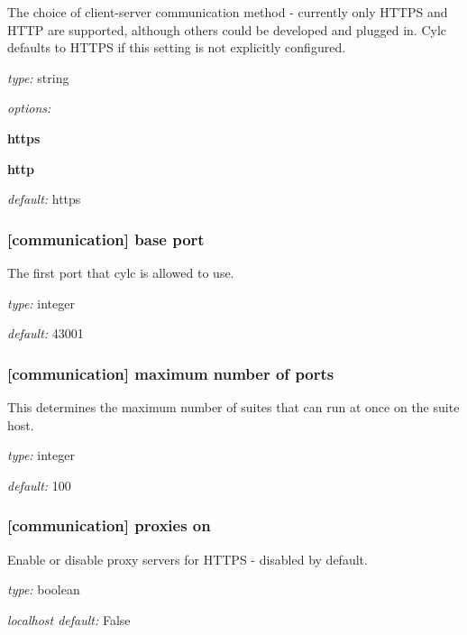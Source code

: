 The choice of client-server communication method - currently only HTTPS
and HTTP are supported, although others could be developed and plugged in.
Cylc defaults to HTTPS if this setting is not explicitly configured.

\begin{myitemize}
\item {\em type:} string
\item {\em options:}
    \begin{myitemize}
    \item {\bf https}
    \item {\bf http}
    \end{myitemize}
\item {\em default:} https
\end{myitemize}

\subsubsection[base port]{[communication] \textrightarrow base port }

The first port that cylc is allowed to use.

\begin{myitemize}
\item {\em type:} integer
\item {\em default:} 43001
\end{myitemize}

\subsubsection[maximum number of ports]{[communication] \textrightarrow maximum number of ports}

This determines the maximum number of suites that can run at once on the
suite host.

\begin{myitemize}
\item {\em type:} integer
\item {\em default:} 100
\end{myitemize}

\subsubsection[proxies on]{[communication] \textrightarrow proxies on}

Enable or disable proxy servers for HTTPS - disabled by default.

\begin{myitemize}
\item {\em type:} boolean
\item {\em localhost default:} False
\end{myitemize}

